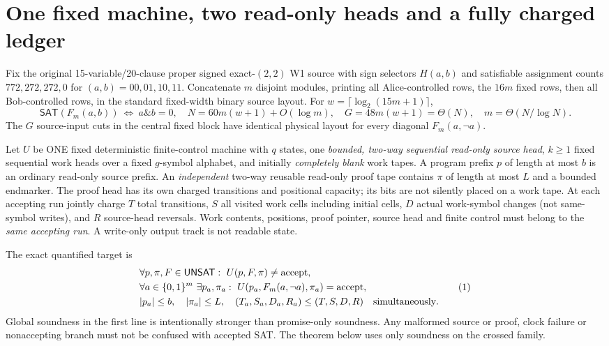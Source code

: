 \documentclass[11pt]{article}
\newcommand{\SAT}{\mathsf{SAT}}
\newcommand{\UNSAT}{\mathsf{UNSAT}}
\begin{document}
\section{One fixed machine, two read-only heads and a fully charged ledger}
Fix the original 15-variable/20-clause proper signed exact-$(2,2)$ W1
source with sign selectors $H(a,b)$ and satisfiable assignment counts
$772,272,272,0$ for $(a,b)=00,01,10,11$. Concatenate $m$ disjoint
modules, printing all Alice-controlled rows, the $16m$ fixed rows,
then all Bob-controlled rows, in the standard fixed-width binary source
layout. For $w=\lceil\log_2(15m+1)\rceil$,
\[
 \SAT(F_m(a,b))\ \Longleftrightarrow\ a\mathbin{\&}b=0,\quad
 N=60m(w+1)+O(\log m),\quad
 G=48m(w+1)=\Theta(N),\quad m=\Theta(N/\log N).
\]
The $G$ source-input cuts in the central fixed block have
identical physical layout for every diagonal $F_m(a,\neg a)$.

Let $U$ be ONE fixed deterministic finite-control machine with
$q$ states, one \emph{bounded, two-way sequential read-only source head},
$k\ge1$ fixed sequential work heads over a fixed $g$-symbol
alphabet, and initially \emph{completely blank} work tapes.
A program prefix $p$ of length at most $b$ is an ordinary read-only
source prefix. An \emph{independent} two-way reusable read-only proof
tape contains $\pi$ of length at most $L$ and a bounded endmarker.
The proof head has its own charged transitions and positional capacity;
its bits are not silently placed on a work tape.
At each accepting run jointly charge $T$ total transitions,
$S$ all visited work cells including initial cells,
$D$ actual work-symbol changes (not same-symbol writes),
and $R$ source-head reversals. Work contents, positions, proof
pointer, source head and finite control must belong to the
\emph{same accepting run}. A write-only output track is not readable state.

The exact quantified target is
\[
\begin{split}
&\forall p,\pi,F\in\UNSAT:\ U(p,F,\pi)\ne\textnormal{accept},\\
&\forall a\in\{0,1\}^{m}\ \exists p_a,\pi_a:\ 
U(p_a,F_m(a,\neg a),\pi_a)=\textnormal{accept},\\
& |p_a|\le b,\quad|\pi_a|\le L,\quad
(T_a,S_a,D_a,R_a)\le(T,S,D,R)
\quad\textnormal{simultaneously}.
\end{split}\tag{1}
\]
Global soundness in the first line is intentionally stronger than
promise-only soundness. Any malformed source or proof, clock failure
or nonaccepting branch must not be confused with accepted SAT.
The theorem below uses only soundness on the crossed family.
\end{document}
